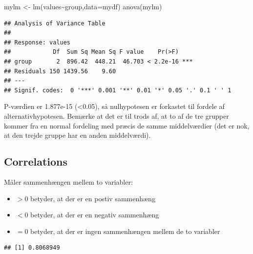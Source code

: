 \documentclass[
]{book}
\newenvironment{Shaded}{\begin{snugshade}}{\end{snugshade}}
\newcommand{\AttributeTok}[1]{\textcolor[rgb]{0.77,0.63,0.00}{#1}}
\newcommand{\FunctionTok}[1]{\textcolor[rgb]{0.00,0.00,0.00}{#1}}
\newcommand{\NormalTok}[1]{#1}
\newcommand{\OtherTok}[1]{\textcolor[rgb]{0.56,0.35,0.01}{#1}}
\newcommand{\SpecialCharTok}[1]{\textcolor[rgb]{0.00,0.00,0.00}{#1}}
\providecommand{\tightlist}{%
  \setlength{\itemsep}{0pt}\setlength{\parskip}{0pt}}
\begin{document}
\begin{Shaded}
\begin{Highlighting}[]
\NormalTok{mylm }\OtherTok{\textless{}{-}} \FunctionTok{lm}\NormalTok{(values}\SpecialCharTok{\textasciitilde{}}\NormalTok{group,}\AttributeTok{data=}\NormalTok{mydf)}
\FunctionTok{anova}\NormalTok{(mylm)}
\end{Highlighting}
\end{Shaded}

\begin{verbatim}
## Analysis of Variance Table
## 
## Response: values
##            Df  Sum Sq Mean Sq F value    Pr(>F)    
## group       2  896.42  448.21  46.703 < 2.2e-16 ***
## Residuals 150 1439.56    9.60                      
## ---
## Signif. codes:  0 '***' 0.001 '**' 0.01 '*' 0.05 '.' 0.1 ' ' 1
\end{verbatim}

P-værdien er 1.877e-15 (\textless0.05), så nulhypotesen er forkastet til fordele af alternativhypotesen. Bemærke at det er til trods af, at to af de tre grupper kommer fra en normal fordeling med præcis de samme middelværdier (det er nok, at den trejde gruppe har en anden middelværdi).

\hypertarget{correlations}{%
\subsection{Correlations}\label{correlations}}

Måler sammenhængen mellem to variabler:

\begin{itemize}
\tightlist
\item
  \(>0\) betyder, at der er en postiv sammenhæng
\item
  \(<0\) betyder, at der er en negativ sammenhæng
\item
  \(=0\) betyder, at der er ingen sammenhængen mellem de to variabler
\end{itemize}

\begin{Shaded}
\end{Shaded}

\begin{verbatim}
## [1] 0.8068949
\end{verbatim}
\end{document}
